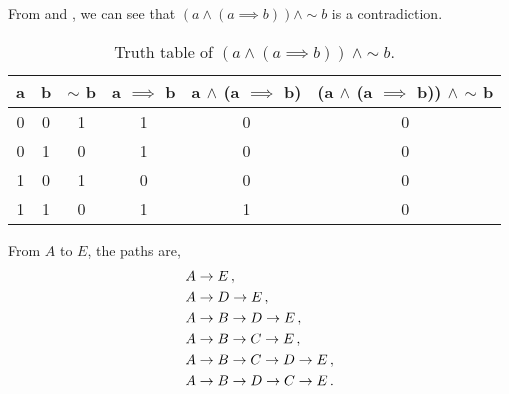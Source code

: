 \begin{subquestions}

\subquestion

From  and , we can see that $(a \land (a \implies b)) \land \sim b$ is a contradiction.
\begin{table}[ht]
	\centering
	\begin{tabular}{|c|c|c|c|c|c|}
		\hline
		a & b & $\sim$ b & a $\implies$ b & a $\land$ (a $\implies$ b) & (a $\land$ (a $\implies$ b)) $\land$ $\sim$ b \\
		\hline
		0 & 0 & 1 & 1 & 0 & 0 \\
		0 & 1 & 0 & 1 & 0 & 0 \\
		1 & 0 & 1 & 0 & 0 & 0 \\
		1 & 1 & 0 & 1 & 1 & 0 \\
		\hline
	\end{tabular}
	\caption{\label{2009:q2:tab:TruthTab1} Truth table of $(a \land (a \implies b)) ~\land \sim b$.}
\end{table}


\subquestion

From $A$ to $E$, the paths are,
\begin{align}
	& A \rightarrow E\,, \nonumber \\
	& A \rightarrow D \rightarrow E\,, \nonumber \\
	& A \rightarrow B \rightarrow D \rightarrow E\,, \nonumber \\
	& A \rightarrow B \rightarrow C \rightarrow E\,, \nonumber \\
	& A \rightarrow B \rightarrow C \rightarrow D \rightarrow E\,, \nonumber \\
	& A \rightarrow B \rightarrow D \rightarrow C \rightarrow E\,. 	
\end{align}



\end{subquestions}
